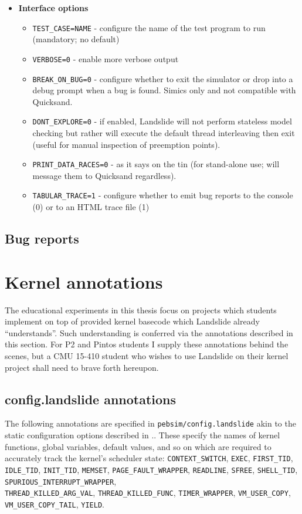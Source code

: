 \begin{itemize}
\item {\bf Interface options}
\begin{itemize}
	\item {\tt TEST\_CASE=NAME} - configure the name of the test program to run (mandatory; no default)
	\item {\tt VERBOSE=0} - enable more verbose output
	\item {\tt BREAK\_ON\_BUG=0} - configure whether to exit the simulator or drop into a debug prompt when a bug is found. Simics only and not compatible with Quicksand.
	\item {\tt DONT\_EXPLORE=0} - if enabled, Landslide will not perform stateless model checking but rather will execute the default thread interleaving then exit (useful for manual inspection of preemption points).
	\item {\tt PRINT\_DATA\_RACES=0} - as it says on the tin (for stand-alone use; will message them to Quicksand regardless).
	\item {\tt TABULAR\_TRACE=1} - configure whether to emit bug reports to the console (0) or to an HTML trace file (1)
\end{itemize}
\end{itemize}

\subsection{Bug reports}

\section{Kernel annotations}

The educational experiments in this thesis focus on projects which students implement on top of provided kernel basecode which Landslide already ``understands''.
Such understanding is conferred via the annotations described in this section.
For P2 and Pintos students I supply these annotations behind the scenes,
but a CMU 15-410 student who wishes to use Landslide on their kernel project shall need to brave forth hereupon.

\subsection{config.landslide annotations}

The following annotations are specified in {\tt pebsim/config.landslide} akin to the static configuration options
described in \sect{\ref{sec:landslide-directly}}..
These specify the names of kernel functions, global variables, default values, and so on
which are required to accurately track the kernel's scheduler state:
{\tt CONTEXT\_SWITCH},
{\tt EXEC},
{\tt FIRST\_TID},
{\tt IDLE\_TID},
{\tt INIT\_TID},
{\tt MEMSET},
{\tt PAGE\_FAULT\_WRAPPER},
{\tt READLINE},
{\tt SFREE},
{\tt SHELL\_TID},
{\tt SPURIOUS\_INTERRUPT\_WRAPPER},
\\
{\tt THREAD\_KILLED\_ARG\_VAL},
{\tt THREAD\_KILLED\_FUNC},
{\tt TIMER\_WRAPPER},
{\tt VM\_USER\_COPY},
\\
{\tt VM\_USER\_COPY\_TAIL},
{\tt YIELD}.

